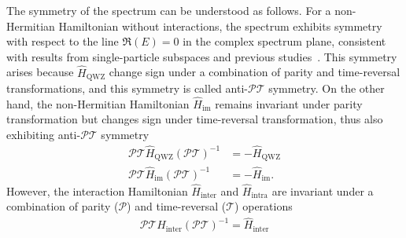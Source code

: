 \documentclass[longbibliography, aps, prx, amsmath, amssymb, amsfonts, twocolumn,superscriptaddress, footinbib]{revtex4-1}
\begin{document}

	The symmetry of the spectrum can be understood as follows. For a non-Hermitian Hamiltonian without interactions, the spectrum exhibits symmetry with respect to the line $\Re(E)=0$ in the complex spectrum plane, consistent with results from single-particle subspaces and previous studies~\cite{nakamura2023universal, ma2024non,schindler2023hermitian}. This symmetry arises because $\hat{H}_{\text{QWZ}}$ change sign under a combination of parity and time-reversal transformations, and this symmetry is called anti-$\mathcal{PT}$ symmetry. On the other hand, the non-Hermitian Hamiltonian $\hat{H}_{\text{im}}$ remains invariant under parity transformation but changes sign under time-reversal transformation, thus also exhibiting anti-$\mathcal{PT}$ symmetry
	\begin{equation}
		\begin{split}
			\mathcal{PT} \hat{H}_{\text{QWZ}} (\mathcal{PT})^{-1} &= -\hat{H}_{\text{QWZ}} \\
			\mathcal{PT} \hat{H}_{\text{im}} (\mathcal{PT})^{-1} &= -\hat{H}_{\text{im}}.
		\end{split}
	\end{equation}
	However, the interaction Hamiltonian $\hat{H}_{\text{inter}}$ and $\hat{H}_{\text{intra}}$ are invariant under a combination of parity ($\mathcal{P}$) and time-reversal ($\mathcal{T}$) operations
	\begin{equation}
		\begin{split}
			\mathcal{PT} \hat{H}_{\text{inter}} (\mathcal{PT})^{-1} = \hat{H}_{\text{inter}}%
		\end{split}
	\end{equation}
\end{document}
